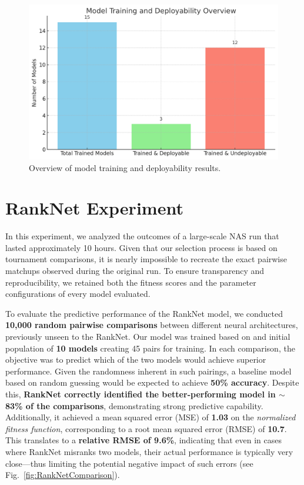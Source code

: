 \bigskip

\begin{figure}[ht]
    \centering
    \includegraphics[width=0.85\linewidth]{Pictures/MemoryEstimationTest.png}
    \caption{Overview of model training and deployability results.}
    \label{fig:memoryEstimationTest}
\end{figure}





\section{RankNet Experiment}
\label{sec:ranknet_experiment}

In this experiment, we analyzed the outcomes of a large-scale NAS run that lasted approximately 10 hours. Given that our selection process is based on tournament comparisons, it is nearly impossible to recreate the exact pairwise matchups observed during the original run. To ensure transparency and reproducibility, we retained both the fitness scores and the parameter configurations of every model evaluated.

To evaluate the predictive performance of the RankNet model, we conducted \textbf{10{,}000 random pairwise comparisons} between different neural architectures, previously unseen to the RankNet. Our model was trained based on and initial population of \textbf{10 models} creating 45 pairs for training. In each comparison, the objective was to predict which of the two models would achieve superior performance. Given the randomness inherent in such pairings, a baseline model based on random guessing would be expected to achieve \textbf{50\% accuracy}. Despite this, \textbf{RankNet correctly identified the better-performing model in $\sim$83\% of the comparisons}, demonstrating strong predictive capability. Additionally, it achieved a mean squared error (MSE) of \textbf{1.03} on the \textit{normalized fitness function}, corresponding to a root mean squared error (RMSE) of \textbf{10.7}. This translates to a \textbf{relative RMSE of 9.6\%}, indicating that even in cases where RankNet misranks two models, their actual performance is typically very close—thus limiting the potential negative impact of such errors (see Fig.~\ref{fig:RankNetComparison}).


